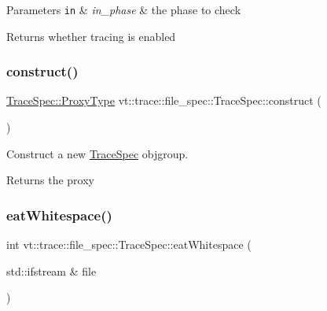\begin{DoxyParams}[1]{Parameters}
\mbox{\tt in}  & {\em in\+\_\+phase} & the phase to check\\
\hline
\end{DoxyParams}
\begin{DoxyReturn}{Returns}
whether tracing is enabled 
\end{DoxyReturn}
\mbox{\label{structvt_1_1trace_1_1file__spec_1_1_trace_spec_a66e362b05b4af9a4e4ef514a4e272599}} 
\subsubsection{\texorpdfstring{construct()}{construct()}}
{\footnotesize\ttfamily \hyperlink{structvt_1_1trace_1_1file__spec_1_1_trace_spec_a26160cff9bb5115866943ed823405f1f}{Trace\+Spec\+::\+Proxy\+Type} vt\+::trace\+::file\+\_\+spec\+::\+Trace\+Spec\+::construct (\begin{DoxyParamCaption}{ }\end{DoxyParamCaption})\hspace{0.3cm}{\ttfamily [static]}}



Construct a new {\ttfamily \hyperlink{structvt_1_1trace_1_1file__spec_1_1_trace_spec}{Trace\+Spec}} objgroup. 

\begin{DoxyReturn}{Returns}
the proxy 
\end{DoxyReturn}
\mbox{\label{structvt_1_1trace_1_1file__spec_1_1_trace_spec_a372568633fa39959d508984e5eb2ff96}} 
\subsubsection{\texorpdfstring{eat\+Whitespace()}{eatWhitespace()}}
{\footnotesize\ttfamily int vt\+::trace\+::file\+\_\+spec\+::\+Trace\+Spec\+::eat\+Whitespace (\begin{DoxyParamCaption}\item[{std\+::ifstream \&}]{file }\end{DoxyParamCaption})\hspace{0.3cm}{\ttfamily [private]}}



